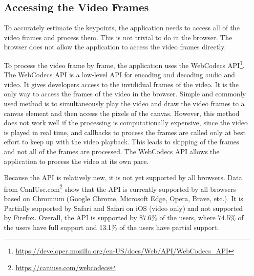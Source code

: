 \subsection{Accessing the Video Frames}

To accurately estimate the keypoints, the application needs to access all of the video frames and process them. This is not trivial to do in the browser. The browser does not allow the application to access the video frames directly.

To process the video frame by frame, the application uses the WebCodecs API\footnote{\url{https://developer.mozilla.org/en-US/docs/Web/API/WebCodecs_API}}. The WebCodecs API is a low-level API for encoding and decoding audio and video. It gives developers access to the invididual frames of the video. It is the only way to access the frames of the video in the browser. Simple and commonly used method is to simultaneously play the video and draw the video  frames to a canvas element and then access the pixels of the canvas. However, this method does not work well if the processing is computationally expensive, since the video is played in real time, and callbacks to process the frames are called only at best effort to keep up with the video playback. This leads to skipping of the frames and not all of the frames are processed. The WebCodecs API allows the application to process the video at its own pace.

Because the API is relatively new, it is not yet supported by all browsers. Data from CanIUse.com\footnote{\url{https://caniuse.com/webcodecs}} show that the API is currently supported by all browsers based on Chromium (Google Chrome, Microsoft Edge, Opera, Brave, etc.). It is Partially supported by Safari and Safari on iOS (video only) and not supported by Firefox. Overall, the API is supported by 87.6\% of the users, where 74.5\% of the users have full support and 13.1\% of the users have partial support.



